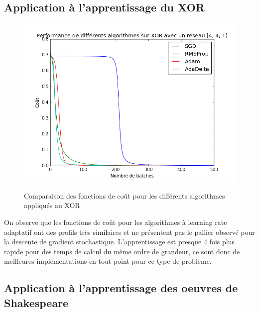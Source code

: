 \subsection{Application à l'apprentissage du XOR}

\begin{figure}[!h]
\begin{center}
	{\includegraphics[scale=0.4]{images/chapter8/xor_comparison_algo.png}\label{Algorithmes}}
  \caption{Comparaison des fonctions de coût pour les différents algorithmes appliqués au XOR}
\end{center}
\end{figure}

On observe que les fonctions de coût pour les algorithmes à learning rate adaptatif ont des profils très similaires et ne présentent pas le pallier observé pour la descente de gradient stochastique. L'apprentissage est presque 4 fois plus rapide pour des temps de calcul du même ordre de grandeur, ce sont donc de meilleures implémentations en tout point pour ce type de problème.

\subsection{Application à l'apprentissage des oeuvres de Shakespeare}

